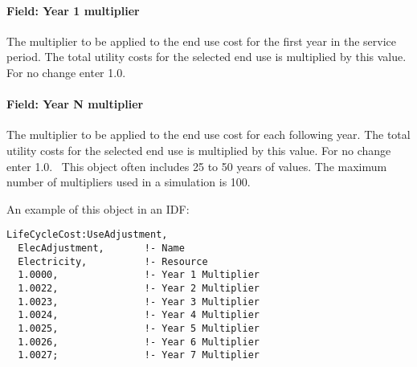 \paragraph{Field: Year 1 multiplier}\label{field-year-1-multiplier}

The multiplier to be applied to the end use cost for the first year in the service period. The total utility costs for the selected end use is multiplied by this value. For no change enter 1.0.

\paragraph{Field: Year N multiplier}\label{field-year-n-multiplier}

The multiplier to be applied to the end use cost for each following year. The total utility costs for the selected end use is multiplied by this value. For no change enter 1.0.~ This object often includes 25 to 50 years of values. The maximum number of multipliers used in a simulation is 100.

An example of this object in an IDF:

\begin{lstlisting}
LifeCycleCost:UseAdjustment,
  ElecAdjustment,       !- Name
  Electricity,          !- Resource
  1.0000,               !- Year 1 Multiplier
  1.0022,               !- Year 2 Multiplier
  1.0023,               !- Year 3 Multiplier
  1.0024,               !- Year 4 Multiplier
  1.0025,               !- Year 5 Multiplier
  1.0026,               !- Year 6 Multiplier
  1.0027;               !- Year 7 Multiplier
\end{lstlisting}